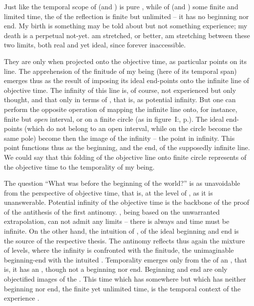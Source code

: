\pa Just like the temporal scope of  (and ) is pure
, while of  (and ) some finite and
limited time, the  of the reflection  is finite but
unlimited -- it has no  beginning nor end. My birth is something
 may be told about but not something  experience; my death is a
perpetual not-yet.  am stretched, or better,  am stretching
 between these two limits, both real and yet ideal, since forever
inaccessible.

They are  only when projected onto the objective time, as particular
points on its line.  The apprehension of the finitude of my being (here
of its temporal span) emerges thus as the result of imposing its ideal
end-points onto the infinite line of objective time.  The infinity of this line
is, of course, not experienced but only thought, and that only in terms of
, that is, as potential infinity. 
But one can perform the opposite operation of mapping the infinite line onto, for
instance, finite but {\em open} interval, or on a finite circle (as in
figure~I:, p.\pageref{fi:stages}).  The ideal end-points (which do
not belong to an open interval, while on the circle become the same pole) become
then the image of the infinity -- the point in infinity. This point functions
thus as the beginning, and the end, of the supposedly infinite line. We could
say that this folding of the objective line onto finite circle represents
 of the objective time to the temporality of my being.


The question ``What was before the beginning of the world?'' is as unavoidable
from the perspective of objective time, that is, at the level of ,
as it is unanswerable.  Potential infinity of the objective time is the backbone
of the proof of the antithesis of the first antinomy. , being based on the unwarranted extrapolation, can not admit any
limits -- there is always  and time must be infinite. On the other
hand, the intuition of , of the ideal 
beginning and end is the source of the respective thesis.  The antinomy reflects
thus again the mixture of levels, where the  infinity is
confronted with the  finitude, the unimaginable beginning-end
with the intuited .  Temporality emerges only from the
 of an , that is, it has an , though not
a beginning nor end. Beginning and end are only {objectified} images of the
.  This time which has  somewhere but which has
neither beginning nor end, the finite yet unlimited time, is the temporal
context of the experience .

